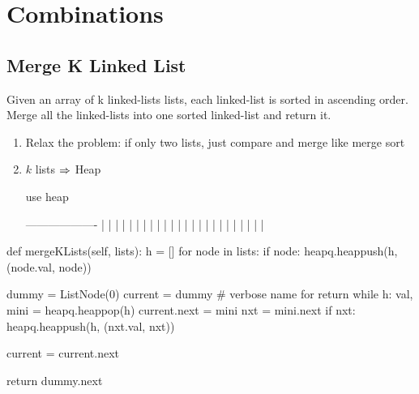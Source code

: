 \section{Combinations}
\subsection{Merge K Linked List}
Given an array of k linked-lists lists, each linked-list is sorted in ascending order. Merge all the linked-lists into one sorted linked-list and return it.
\begin{enumerate}
\item Relax the problem: if only two lists, just compare and merge like merge sort 
\item $k$ lists $\Rightarrow$ Heap
\begin{python}
use heap


-------------------
    |  |  |  |  |  |
    |  |  |  |  |  |
    |  |  |  |  |  |
    |  |  |  |  |  |
\end{python}
\end{enumerate}
\begin{python}
def mergeKLists(self, lists):
  h = []
  for node in lists:
    if node:
      heapq.heappush(h, (node.val, node))

  dummy = ListNode(0)
  current = dummy  # verbose name for return
  while h:
    val, mini = heapq.heappop(h)
    current.next = mini
    nxt = mini.next
    if nxt:
      heapq.heappush(h, (nxt.val, nxt))

    current = current.next

  return dummy.next
\end{python}
